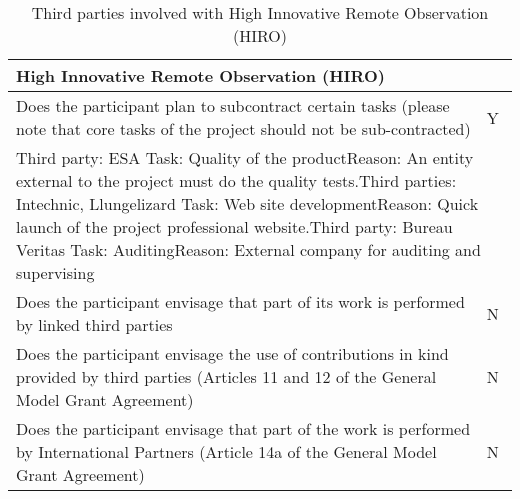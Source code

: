 \begin{table}[H]
	\centering
	\begin{tabular}{|p{10cm}|p{4cm}|}
		\hline
		
		\multicolumn{2}{|p{14cm}|}{\textbf{High Innovative Remote Observation (HIRO)}}\\
		
		\hline
		
		Does the participant plan to subcontract certain tasks (please note that core tasks of the project should not be sub-contracted) & Y\\
		
		\hline
		
		\multicolumn{2}{|p{14cm}|}{Third party: ESA \newline Task: Quality of the product\newline Reason: An entity external to the project must do the quality tests.\vspace{0.2cm}\newline Third parties: Intechnic, Llungelizard \newline Task: Web site development\newline Reason: Quick launch of the project professional website.\vspace{0.2cm}\newline Third party: Bureau Veritas \newline Task: Auditing\newline Reason: External company for auditing and supervising}\\
		
		\hline
		
		Does the participant envisage that part of its work is performed by linked third parties & N\\
		
		\hline
		
		Does the participant envisage the use of contributions in kind provided by third parties (Articles 11 and 12 of the General Model Grant Agreement) & N\\
		
		\hline
		
		Does the participant envisage that part of the work is performed by International Partners (Article 14a of the General Model Grant Agreement) & N\\

		\hline
	\end{tabular}
	\caption{Third parties involved with High Innovative Remote Observation (HIRO)}
\end{table}



